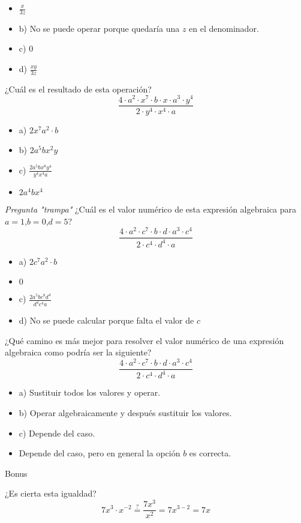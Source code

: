 \begin{itemize}
	\item {} $\frac{x}{3z}$
	\item b) No se puede operar porque quedaría una $z$ en el denominador.
	\item c) $0$
	\item d) $\frac{xy}{3z}$
\end{itemize}


\newpreg ¿Cuál es el resultado de esta operación?
\[
	\frac{4·a^2·x^7·b·x·a^3·y^4}{2·y^4·x^4·a}
\]

\begin{itemize}
	\item a) $2x^7a^2·b$
	\item b) $2a^5bx^2y$
	\item c) $\frac{2a^5bx^8y^4}{y^4x^4a}$
	\item {} $2a^4bx^4$
\end{itemize}


\newpreg \textit{Pregunta "trampa"} ¿Cuál es el valor numérico de esta expresión algebraica para $a=1$,$b=0$,$d=5$?
\[
	\frac{4·a^2·c^7·b·d·a^3·c^4}{2·c^4·d^4·a}
\]

\begin{itemize}
	\item a) $2c^7a^2·b$
	\item {} $0$
	\item c) $\frac{2a^5bc^8d^4}{d^4c^4a}$
	\item d) No se puede calcular porque falta el valor de $c$
\end{itemize}

\newpreg ¿Qué camino es más mejor para resolver el valor numérico de una expresión algebraica como podría ser la siguiente?
\[
	\frac{4·a^2·c^7·b·d·a^3·c^4}{2·c^4·d^4·a}
\]

\begin{itemize}
	\item a) Sustituir todos los valores y operar.
	\item b) Operar algebraicamente y después sustituir los valores.
	\item c) Depende del caso.
	\item {} Depende del caso, pero en general la opción $b$ es correcta.
\end{itemize}


\newbloq Bonus

\newpreg ¿Es cierta esta igualdad?
\[
	7x^3·x^{-2} \overset{?}{=} \frac{7x^3}{x^2} = 7x^{3-2} = 7x
\]

